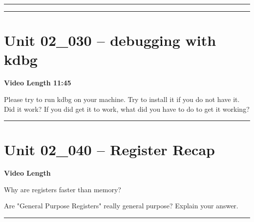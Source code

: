 \documentclass[letterpaper,12pt]{exam}
\newcommand{\unit}{Unit 02}
\begin{document}
\begin{questions}
      \rule{0.5\textwidth}{.4pt} %
      
 \rule{0.5\textwidth}{.4pt} %
\section*{\unit\_030 -- debugging with kdbg}
\par{\selectfont\textbf{Video Length 11:45}}
\begin{samepage}
    \question Please try to run kdbg on your machine.  Try to install it if you do not have it.  Did it work?  If you did get it to work, what did you have to do to get it working?
    \vspace{55mm}
\end{samepage}

\rule{0.5\textwidth}{.4pt} %

\section*{\unit\_040 -- Register Recap}
\par{\selectfont\textbf{Video Length }}
\begin{samepage}
    \question Why are registers faster than memory?
    \vspace{5mm}
\end{samepage}

\begin{samepage}
    \question Are "General Purpose Registers" really general purpose? Explain your answer.
    \vspace{5mm}
\end{samepage}
\par
 

\rule{0.5\textwidth}{.4pt} %

\end{questions}
\end{document}
